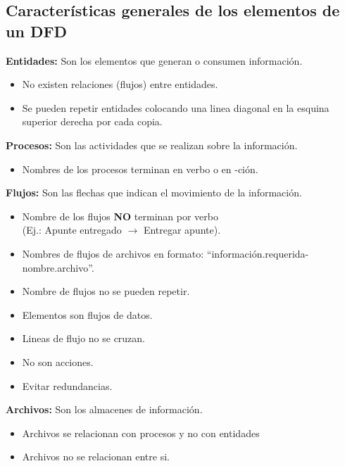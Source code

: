 \documentclass{templateNote}
\begin{document}
\subsection{Características generales de los elementos de un DFD}
\noindent\textbf{Entidades:} Son los elementos que generan o consumen información.
\begin{itemize}
    \item No existen relaciones (flujos) entre entidades.
    \item Se pueden repetir entidades colocando una linea diagonal en la esquina superior derecha por cada copia.
\end{itemize}
\textbf{Procesos:} Son las actividades que se realizan sobre la información.
\begin{itemize}
    \item Nombres de los procesos terminan en verbo o en -ción.
\end{itemize}
\textbf{Flujos:} Son las flechas que indican el movimiento de la información.
\begin{itemize}
    \item Nombre de los flujos \textbf{NO} terminan por verbo \\(Ej.: Apunte entregado $\rightarrow$ Entregar apunte).
    \item Nombres de flujos de archivos en formato: ``información.requerida-nombre.archivo''.
    \item Nombre de flujos no se pueden repetir.
    \item Elementos son flujos de datos.
    \item Lineas de flujo no se cruzan.
    \item No son acciones.
    \item Evitar redundancias.
\end{itemize}
\textbf{Archivos:} Son los almacenes de información.
\begin{itemize}
    \item Archivos se relacionan con procesos y no con entidades
    \item Archivos no se relacionan entre si.
\end{itemize}
\end{document}
